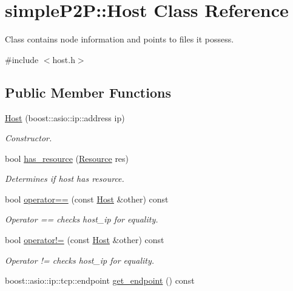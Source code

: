 \hypertarget{classsimpleP2P_1_1Host}{}\section{simple\+P2P\+:\+:Host Class Reference}
\label{classsimpleP2P_1_1Host}


Class contains node information and points to files it possess.  




{\ttfamily \#include $<$host.\+h$>$}

\subsection*{Public Member Functions}
\begin{DoxyCompactItemize}
\item 
\hyperlink{classsimpleP2P_1_1Host_abbe0b5c51195b8cf2019d791ace5a5c7}{Host} (boost\+::asio\+::ip\+::address ip)
\begin{DoxyCompactList}\small\item\em Constructor. \end{DoxyCompactList}\item 
bool \hyperlink{classsimpleP2P_1_1Host_a5d4b48eaf05f5353816aae78cbd29c64}{has\+\_\+resource} (\hyperlink{classsimpleP2P_1_1Resource}{Resource} res)
\begin{DoxyCompactList}\small\item\em Determines if host has resource. \end{DoxyCompactList}\item 
bool \hyperlink{classsimpleP2P_1_1Host_aadac09c6ab516f62e5eebe28dd584626}{operator==} (const \hyperlink{classsimpleP2P_1_1Host}{Host} \&other) const
\begin{DoxyCompactList}\small\item\em Operator == checks host\+\_\+ip for equality. \end{DoxyCompactList}\item 
bool \hyperlink{classsimpleP2P_1_1Host_a13516e95bf59bb8dd6eea8940f8bb677}{operator!=} (const \hyperlink{classsimpleP2P_1_1Host}{Host} \&other) const
\begin{DoxyCompactList}\small\item\em Operator != checks host\+\_\+ip for equality. \end{DoxyCompactList}\item 
boost\+::asio\+::ip\+::tcp\+::endpoint \hyperlink{classsimpleP2P_1_1Host_a25780ee00b380a84ad0a3312bfa635cb}{get\+\_\+endpoint} () const

\end{DoxyCompactItemize}

